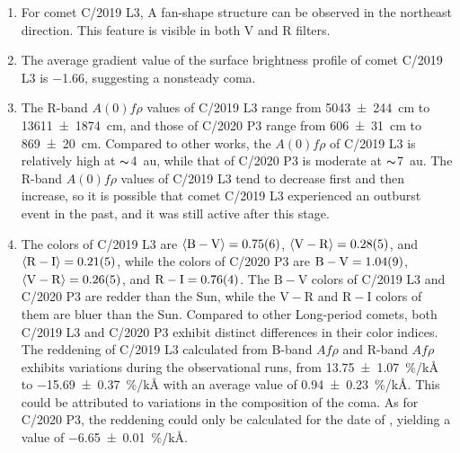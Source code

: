 \begin{enumerate}
    \item For comet C/2019 L3, A fan-shape structure can be observed in the northeast direction. This feature is visible in both V and R filters. 
    \item The average gradient value  of the surface brightness profile of comet C/2019 L3 is \num{-1.66}, suggesting a nonsteady coma. 
    \item The R-band $A(0)f\rho$ values of C/2019 L3 range from {\qty{5043 +- 244}{\cm}} to {\qty{13611 +- 1874}{\cm}}, and those of C/2020 P3 range from {\qty{606 +- 31}{\cm}} to {\qty{869 +- 20}{\cm}}. Compared to other works, the $A(0)f\rho$ of C/2019 L3 is relatively high at $\thicksim${\qty{4}{\astronomicalunit}}, while that of C/2020 P3 is moderate at $\thicksim${\qty{7}{\astronomicalunit}}. The R-band $A(0)f\rho$ values of C/2019 L3 tend to decrease first and then increase, so it is possible that comet C/2019 L3 experienced an outburst event in the past, and it was still active after this stage. 
    \item The colors of C/2019 L3 are  
        $\langle \mathrm{B-V} \rangle = \num{0.75 +- 0.06}$, 
        $\langle \mathrm{V-R} \rangle = \num{0.28 +- 0.05}$, and 
        $\langle \mathrm{R-I} \rangle = \num{0.21 +- 0.05}$,  
        while the colors of C/2020 P3 are 
        $\mathrm{B-V} = \num{1.04 +- 0.09}$, 
        $\langle \mathrm{V-R} \rangle = \num{0.26 +- 0.05}$, and 
        $\mathrm{R-I} = \num{0.76 +- 0.04}$. 
        The $\mathrm{B-V}$ colors of C/2019 L3 and C/2020 P3 are redder than the Sun, while the $\mathrm{V-R}$ and $\mathrm{R-I}$ colors of them are bluer than the Sun. Compared to other Long-period comets, both C/2019 L3 and C/2020 P3 exhibit distinct differences in their color indices. The reddening of C/2019 L3 calculated from B-band $Af\rho$ and R-band $Af\rho$ exhibits variations during the observational runs, from {\qty{13.75 +- 1.07}{\percent/\kilo\angstrom}} to {\qty{-15.69 +- 0.37}{\percent/\kilo\angstrom}} with an average value of {\qty{0.94 +- 0.23}{\percent/\kilo\angstrom}}. This could be attributed to  variations in the composition of the coma. As for C/2020 P3, the reddening could only be calculated for the date of , yielding a value of {\qty{-6.65 +- 0.01}{\percent/\kilo\angstrom}}. 
\end{enumerate}
